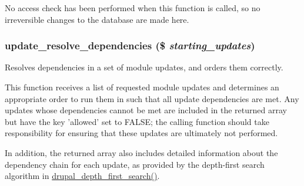 No access check has been performed when this function is called, so no irreversible changes to the database are made here. \hypertarget{update_8inc_aa931d6cdddc2e9e0ec96d240523056e9}{
\subsubsection[{update\_\-resolve\_\-dependencies}]{\setlength{\rightskip}{0pt plus 5cm}update\_\-resolve\_\-dependencies (\$ {\em starting\_\-updates})}}
\label{update_8inc_aa931d6cdddc2e9e0ec96d240523056e9}
Resolves dependencies in a set of module updates, and orders them correctly.

This function receives a list of requested module updates and determines an appropriate order to run them in such that all update dependencies are met. Any updates whose dependencies cannot be met are included in the returned array but have the key 'allowed' set to FALSE; the calling function should take responsibility for ensuring that these updates are ultimately not performed.

In addition, the returned array also includes detailed information about the dependency chain for each update, as provided by the depth-\/first search algorithm in \hyperlink{graph_8inc_ab1e9257090d35212bd3dd3eba7706471}{drupal\_\-depth\_\-first\_\-search()}.


